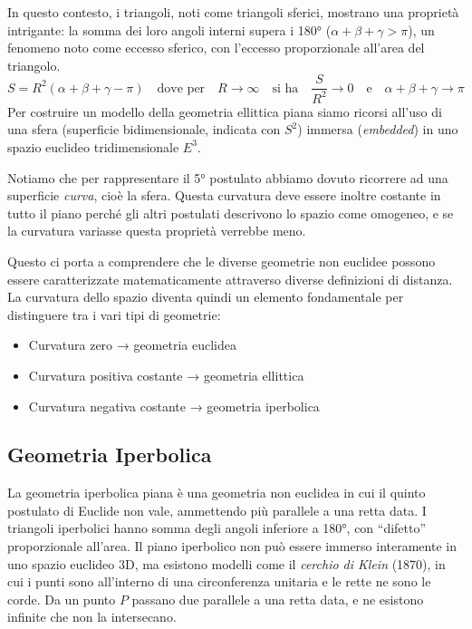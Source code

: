 \vspace{-1em}

In questo contesto, i triangoli, noti come triangoli sferici, mostrano una proprietà intrigante: la somma dei loro angoli interni supera i 180° ($\alpha + \beta + \gamma > \pi$), un fenomeno noto come eccesso sferico, con l'eccesso proporzionale all'area del triangolo.
\vspace{0.2em}
$$
S = R^2(\alpha + \beta + \gamma - \pi) \quad \text{dove per} \quad R \to \infty \quad \text{si ha} \quad \dfrac S{R^2} \to 0 \quad \text{e} \quad \alpha + \beta + \gamma \to \pi
$$
Per costruire un modello della geometria ellittica piana siamo ricorsi all'uso di una sfera (superficie bidimensionale, indicata con $S^2$) immersa (\textit{embedded}) in uno spazio euclideo tridimensionale $E^3$. 

Notiamo che per rappresentare il 5° postulato abbiamo dovuto ricorrere ad una superficie \textit{curva}, cioè la sfera. Questa curvatura deve essere inoltre costante in tutto il piano perché gli altri postulati descrivono lo spazio come omogeneo, e se la curvatura variasse questa proprietà verrebbe meno.

Questo ci porta a comprendere che le diverse geometrie non euclidee possono essere caratterizzate matematicamente attraverso diverse definizioni di distanza. La curvatura dello spazio diventa quindi un elemento fondamentale per distinguere tra i vari tipi di geometrie:
\begin{itemize}
    \item Curvatura zero → geometria euclidea
    \item Curvatura positiva costante → geometria ellittica
    \item Curvatura negativa costante → geometria iperbolica
\end{itemize}

\subsection{Geometria Iperbolica}

La geometria iperbolica piana è una geometria non euclidea in cui il quinto postulato di Euclide non vale, ammettendo più parallele a una retta data. I triangoli iperbolici hanno somma degli angoli inferiore a 180°, con “difetto” proporzionale all’area. Il piano iperbolico non può essere immerso interamente in uno spazio euclideo 3D, ma esistono modelli come il \emph{cerchio di Klein} (1870), in cui i punti sono all’interno di una circonferenza unitaria e le rette ne sono le corde. Da un punto $P$ passano due parallele a una retta data, e ne esistono infinite che non la intersecano.

